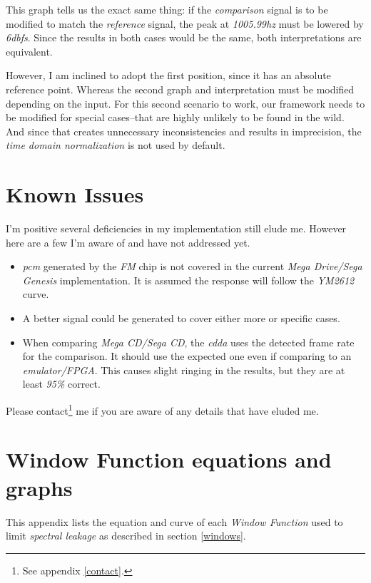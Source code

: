 \documentclass[10pt,a4paper]{report}
\newcommand{\ac}[1]{\textit{\acrshort{#1}}}
\newcommand{\hz}[1]{\textit{#1\acrshort{hz}}}
\newcommand{\db}[1]{\textit{#1\acrshort{dbfs}}}
\begin{document}
\begin{appendices}
This graph tells us the exact same thing: if the \textit{comparison} signal is to be modified to match the \textit{reference} signal, the peak at \hz{1005.99} must be lowered by \db{6}. Since the results in both cases would be the same, both interpretations are equivalent.
	
However, I am inclined to adopt the first position, since it has an absolute reference point. Whereas the second graph and interpretation must be modified depending on the input. For this second scenario to work, our framework needs to be modified for special cases--that are highly unlikely to be found in the wild. And since that creates unnecessary inconsistencies and results in imprecision, the \textit{time domain normalization} is not used by default.

\chapter{Known Issues}

I'm positive several deficiencies in my implementation still elude me. However here are a few I'm aware of and have not addressed yet.

\begin{itemize}
	\item \ac{pcm} generated by the \textit{FM} chip is not covered in the current \textit{Mega Drive/Sega Genesis} implementation. It is assumed the response will follow the \textit{YM2612} curve.
	\item A better signal could  be generated to cover either more or specific cases.
	\item When comparing \textit{Mega CD/Sega CD}, the \textit{\ac{cdda}} uses the detected frame rate for the comparison. It should use the expected one even if comparing to an \textit{emulator/FPGA}. This causes slight ringing in the results, but they are at least \textit{95\%} correct.
\end{itemize}

Please contact\footnote{See appendix \ref{contact}.} me if you are aware of any details that have eluded me.

\chapter{Window Function equations and graphs}
\label{windowfunctiondetails}

This appendix lists the equation and curve of each \textit{Window Function} used to limit \textit{spectral leakage} as described in section \ref{windows}.


\end{appendices}
\end{document}
